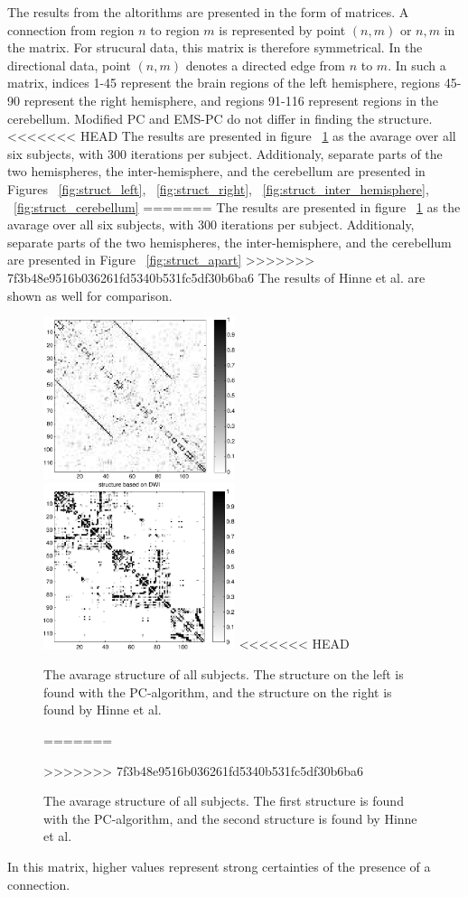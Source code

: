 \documentclass[a4paper, 10pt, english, onecolumn]{article}
\begin{document}
The results from the altorithms are presented in the form of matrices.
A connection from region $n$ to region $m$ is represented by point $(n,m)$ or $n,m$ in the matrix.
For strucural data, this matrix is therefore symmetrical.
In the directional data, point $(n,m)$ denotes a directed edge from $n$ to $m$.
In such a matrix, indices 1-45 represent the brain regions of the left hemisphere, regions 45-90 represent the right hemisphere, and regions 91-116 represent regions in the cerebellum. %
Modified PC and EMS-PC do not differ in finding the structure.
<<<<<<< HEAD
The results are presented in figure ~\ref{fig:struct_avg} as the avarage over all six subjects, with 300 iterations per subject. Additionaly, separate parts of the two hemispheres, the inter-hemisphere, and the cerebellum are presented in Figures ~\ref{fig:struct_left}, ~\ref{fig:struct_right}, ~\ref{fig:struct_inter_hemisphere}, ~\ref{fig:struct_cerebellum}
=======
The results are presented in figure ~\ref{fig:struct_avg} as the avarage over all six subjects, with 300 iterations per subject. Additionaly, separate parts of the two hemispheres, the inter-hemisphere, and the cerebellum are presented in Figure ~\ref{fig:struct_apart}
>>>>>>> 7f3b48e9516b036261fd5340b531fc5df30b6ba6
The results of Hinne et al. are shown as well for comparison.

\begin{figure}[h!]
  \centering
  \includegraphics[width=0.5\textwidth]{images/struct_full}
  \includegraphics[width=0.5\textwidth]{images/structure_max}
<<<<<<< HEAD
  \caption{The avarage structure of all subjects. The structure on the left is found with the PC-algorithm, and the structure on the right is found by Hinne et al.}
=======
  \caption{The avarage structure of all subjects. The first structure is found with the PC-algorithm, and the second structure is found by Hinne et al.}
>>>>>>> 7f3b48e9516b036261fd5340b531fc5df30b6ba6
  \label{fig:struct_avg}
\end{figure}
In this matrix, higher values represent strong certainties of the presence of a connection.
\end{document}
